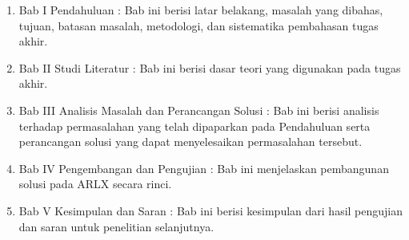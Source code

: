 \begin{enumerate}

    \item Bab I Pendahuluan : Bab ini berisi latar belakang, masalah yang dibahas, tujuan,
    	    batasan masalah, metodologi, dan sistematika pembahasan tugas akhir.

    \item Bab II Studi Literatur : Bab ini berisi dasar teori yang digunakan pada tugas akhir.

    \item Bab III Analisis Masalah dan Perancangan Solusi : Bab ini berisi analisis terhadap
    	    permasalahan yang telah dipaparkan pada Pendahuluan serta perancangan solusi yang
    	    dapat menyelesaikan permasalahan tersebut.

    \item Bab IV Pengembangan dan Pengujian : Bab ini menjelaskan pembangunan solusi pada ARLX
    	    secara rinci.

    \item Bab V Kesimpulan dan Saran : Bab ini berisi kesimpulan dari hasil pengujian dan saran
    	    untuk penelitian selanjutnya.

\end{enumerate}

